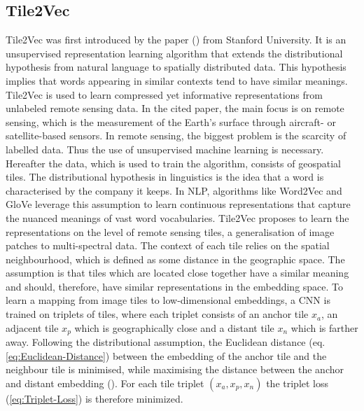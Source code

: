 \subsection{Tile2Vec}
\label{sub:Tile2Vec}

Tile2Vec was first introduced by the paper (\cite{jean_tile2vec_2018}) from Stanford University. It is an unsupervised representation learning algorithm that extends the distributional hypothesis from natural language to spatially distributed data. This hypothesis implies that words appearing in similar contexts tend to have similar meanings. Tile2Vec is used to learn compressed yet informative representations from unlabeled remote sensing data.
\newline
\newline
In the cited paper, the main focus is on remote sensing, which is the measurement of the Earth's surface through aircraft- or satellite-based sensors. In remote sensing, the biggest problem is the scarcity of labelled data. Thus the use of unsupervised machine learning is necessary. Hereafter the data, which is used to train the algorithm, consists of geospatial tiles.
\newline
\newline
The distributional hypothesis in linguistics is the idea that \flqq a word is characterised by the company it keeps\frqq. In \gls{NLP}, algorithms like Word2Vec and GloVe leverage this assumption to learn continuous representations that capture the nuanced meanings of vast word vocabularies.
\newline
\newline
Tile2Vec proposes to learn the representations on the level of remote sensing tiles, a generalisation of image patches to multi-spectral data. The context of each tile relies on the spatial neighbourhood, which is defined as some distance in the geographic space. The assumption is that tiles which are located close together have a similar meaning and should, therefore, have similar representations in the embedding space.
\newline
\newline
To learn a mapping from image tiles to low-dimensional embeddings, a \gls{CNN} is trained on triplets of tiles, where each triplet consists of an anchor tile $x_a$, an adjacent tile $x_p$ which is geographically close and a distant tile $x_n$ which is farther away. Following the distributional assumption, the Euclidean distance (eq. \ref{eq:Euclidean-Distance}) between the embedding of the anchor tile and the neighbour tile is minimised, while maximising the distance between the anchor and distant embedding (). For each tile triplet $(x_a, x_p, x_n)$ the triplet loss (\ref{eq:Triplet-Loss}) is therefore minimized.
